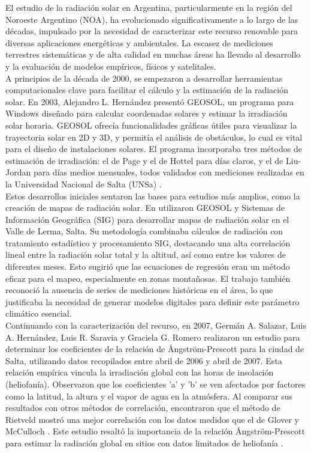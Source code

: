 El estudio de la radiación solar en Argentina, particularmente en la región del Noroeste Argentino (NOA), ha evolucionado significativamente a lo largo de las décadas, impulsado por la necesidad de caracterizar este recurso renovable para diversas aplicaciones energéticas y ambientales. La escasez de mediciones terrestres sistemáticas y de alta calidad en muchas áreas ha llevado al desarrollo y la evaluación de modelos empíricos, físicos y satelitales.\\

A principios de la década de 2000, se empezaron a desarrollar herramientas computacionales clave para facilitar el cálculo y la estimación de la radiación solar. En 2003, Alejandro L. Hernández presentó GEOSOL, un programa para Windows diseñado para calcular coordenadas solares y estimar la irradiación solar horaria. GEOSOL ofrecía funcionalidades gráficas útiles para visualizar la trayectoria solar en 2D y 3D, y permitía el análisis de obstáculos, lo cual es vital para el diseño de instalaciones solares. El programa incorporaba tres métodos de estimación de irradiación: el de Page y el de Hottel \citep{Hottel1976} para días claros, y el de Liu-Jordan \citep{Liu1960}  para días medios mensuales, todos validados con mediciones realizadas en la Universidad Nacional de Salta (UNSa) \citep{Hernandez2003}.\\

Estos desarrollos iniciales sentaron las bases para estudios más amplios, como la creación de mapas de radiación solar. En \citep{Belmonte2006} utilizaron GEOSOL y Sistemas de Información Geográfica (SIG) para desarrollar mapas de radiación solar en el Valle de Lerma, Salta. Su metodología combinaba cálculos de radiación con tratamiento estadístico y procesamiento SIG, destacando una alta correlación lineal entre la radiación solar total y la altitud, así como entre los valores de diferentes meses. Esto sugirió que las ecuaciones de regresión eran un método eficaz para el mapeo, especialmente en zonas montañosas. El trabajo también reconoció la ausencia de series de mediciones históricas en el área, lo que justificaba la necesidad de generar modelos digitales para definir este parámetro climático esencial.\\

Continuando con la caracterización del recurso, en 2007, Germán A. Salazar, Luis A. Hernández, Luis R. Saravia y Graciela G. Romero realizaron un estudio para determinar los coeficientes de la relación de Ångström-Prescott \citep{angstrom1924,prescott1940} para la ciudad de Salta, utilizando datos recopilados entre abril de 2006 y abril de 2007. Esta relación empírica vincula la irradiación global con las horas de insolación (heliofanía). Observaron que los coeficientes 'a' y 'b' se ven afectados por factores como la latitud, la altura y el vapor de agua en la atmósfera. Al comparar sus resultados con otros métodos de correlación, encontraron que el método de Rietveld \citep{Rietveld1978} mostró una mejor correlación con los datos medidos que el de Glover y McCulloch \citep{Glover1958}. Este estudio resaltó la importancia de la relación Ångström-Prescott para estimar la radiación global en sitios con datos limitados de heliofanía \citep{Salazar2007}.\\ 

